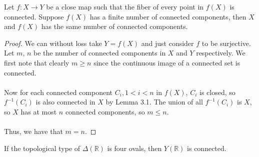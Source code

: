 \documentclass{article}
\newcommand{\Rbb}{\mathbb{R}}
\begin{document}
\begin{lemma}
Let $f: X \to Y$ be a close map such that the fiber of every point in $f(X)$ is connected. Suppose $f(X)$ has a finite number of connected components, then $X$ and $f(X)$ has the same number of connected components.
\end{lemma}

\begin{proof}
We can without loss take $Y = f(X)$ and just consider $f$ to be surjective. Let $m$, $n$ be the number of connected components in $X$ and $Y$ respectively. We first note that clearly $m \geq n$ since the continuous image of a connected set is connected.\\\\
Now for each connected component $C_i, 1 < i < n$ in $f(X)$, $C_i$ is closed, so $f^{-1}(C_i)$ is also connected in $X$ by Lemma 3.1. The union of all $f^{-1}(C_i)$ is $X$, so $X$ has at most $n$ connected components, so $m \leq n$.\\\\
Thus, we have that $m = n$.
\end{proof}

\begin{proposition}
If the topological type of $\Delta(\Rbb)$ is four ovals, then $Y(\Rbb)$ is connected.
\end{proposition}
\end{document}
